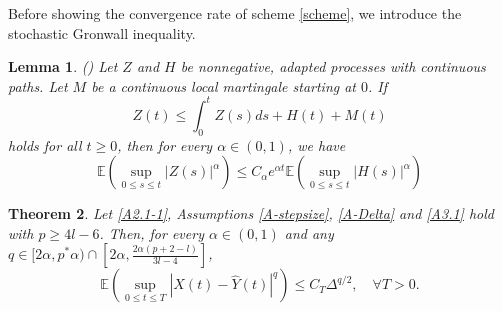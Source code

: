 \documentclass[preprint,12pt,compress]{elsarticle}
\newtheorem{theorem}{Theorem}[section] %
\newtheorem{lemma}[theorem]{Lemma}%
\begin{document}
Before showing the convergence rate of scheme \eqref{scheme}, we introduce the stochastic Gronwall inequality.
\begin{lemma} (\cite[Theorem 4]{scheutzow2013a})  \label{lem-gronwall}
Let $Z$ and $H$ be nonnegative, adapted processes with continuous paths. Let $M$ be a continuous local martingale starting at $0$. If 
\begin{equation*}
	Z(t) \le \int_0^t {Z(s)ds}  + H(t) + M(t)
\end{equation*}	
holds for all $t \ge 0$, then for every $\alpha \in (0, 1)$, we have
\begin{equation*}
	\mathbb{E}\left( {\mathop {\sup }\limits_{0 \le s \le t} {{\left| {Z(s)} \right|}^\alpha }} \right) \le {C_\alpha }{e^{\alpha t}}\mathbb{E}\left( {\mathop {\sup }\limits_{0 \le s \le t} {{\left| {H(s)} \right|}^\alpha }} \right)
\end{equation*}

\end{lemma}


\begin{theorem}   \label{rate1}
Let \eqref{A2.1-1}, Assumptions \ref{A-stepsize}, \ref{A-Delta} and \ref{A3.1} hold with $p \ge 4l-6 $. Then, for every $\alpha \in (0,1)$ and any 
$q \in [2\alpha ,{p^*}\alpha ) \cap \left[ {2\alpha ,{\frac{{2\alpha (p + 2 - l)}}{{3l - 4}}}} \right]$,
\begin{equation*}
	\mathbb{E}\left( {\mathop {\sup }\limits_{0 \le t \le T} {{\left| {X(t) - \hat Y(t)} \right|}^q}} \right) \le {C_T}{\Delta ^{{q}/{2}}}, \quad \forall T > 0.
\end{equation*}
\end{theorem}
\end{document}
